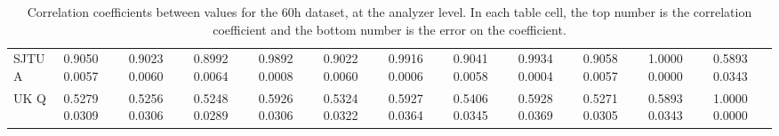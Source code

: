 \begin{landscape}
\begin{table}
\begin{tabularx}{1\linewidth}{@{\extracolsep{\fill}}lXXXXXXXXXXX}
	SJTU A & 0.9050 0.0057 & 0.9023 0.0060 & 0.8992 0.0064 & 0.9892 0.0008 & 0.9022 0.0060 & 0.9916 0.0006 & 0.9041 0.0058 & 0.9934 0.0004 & 0.9058 0.0057 & 1.0000 0.0000 & 0.5893 0.0343  \\
	UK Q   & 0.5279 0.0309 & 0.5256 0.0306 & 0.5248 0.0289 & 0.5926 0.0306 & 0.5324 0.0322 & 0.5927 0.0364 & 0.5406 0.0345 & 0.5928 0.0369 & 0.5271 0.0305 & 0.5893 0.0343 & 1.0000 0.0000  \\
  \bottomrule
\end{tabularx}
\caption[]{Correlation coefficients between \R values for the 60h dataset, at the analyzer level. In each table cell, the top number is the correlation coefficient and the bottom number is the error on the coefficient.}
\label{tab:Corrs_60h_analyzer}
\end{table}
\end{landscape}


